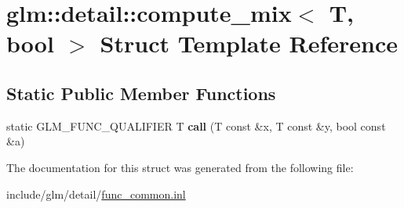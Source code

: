 \hypertarget{structglm_1_1detail_1_1compute__mix_3_01T_00_01bool_01_4}{}\section{glm\+:\+:detail\+:\+:compute\+\_\+mix$<$ T, bool $>$ Struct Template Reference}
\label{structglm_1_1detail_1_1compute__mix_3_01T_00_01bool_01_4}
\subsection*{Static Public Member Functions}
\begin{DoxyCompactItemize}
\item 
\mbox{\label{structglm_1_1detail_1_1compute__mix_3_01T_00_01bool_01_4_a7a83cf7bd102239b974faf18137d8c63}} 
static G\+L\+M\+\_\+\+F\+U\+N\+C\+\_\+\+Q\+U\+A\+L\+I\+F\+I\+ER T {\bfseries call} (T const \&x, T const \&y, bool const \&a)
\end{DoxyCompactItemize}


The documentation for this struct was generated from the following file\+:\begin{DoxyCompactItemize}
\item 
include/glm/detail/\hyperlink{func__common_8inl}{func\+\_\+common.\+inl}\end{DoxyCompactItemize}
